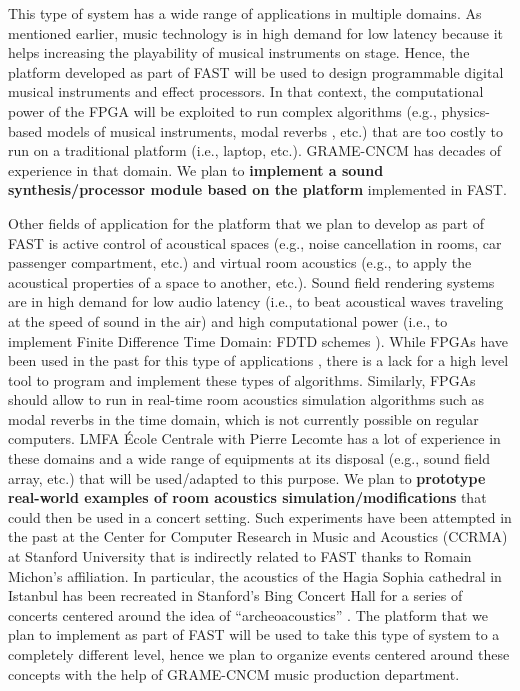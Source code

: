 \documentclass[a4paper,10pt]{article}
\newcommand{\PP}{FAST}
\begin{document}
This type of system has a wide range of applications in multiple domains. As mentioned earlier, music technology is in high demand for low latency because it helps increasing the playability of musical instruments on stage. Hence, the platform developed as part of \PP{} will be used to design programmable digital musical instruments and effect processors. In that context, the computational power of the FPGA will be exploited to run complex algorithms (e.g., physics-based models of musical instruments, modal reverbs \cite{Abel2009}, etc.) that are too costly to run on a traditional platform (i.e., laptop, etc.). GRAME-CNCM has decades of experience in that domain. We plan to \textbf{implement a sound synthesis/processor module based on the platform} implemented in \PP{}.

Other fields of application for the platform that we plan to develop as part of \PP{} is active control of acoustical spaces (e.g., noise cancellation in rooms, car passenger compartment, etc.) and virtual room acoustics (e.g., to apply the acoustical properties of a space to another, etc.). Sound field rendering systems are in high demand for low audio latency (i.e., to beat acoustical waves traveling at the speed of sound in the air) and high computational power (i.e., to implement Finite Difference Time Domain: FDTD schemes \cite{Bilbao2009}). While FPGAs have been used in the past for this type of applications \cite{Tan2019}, there is a lack for a high level tool to program and implement these types of algorithms. Similarly, FPGAs should allow to run in real-time room acoustics simulation algorithms such as modal reverbs \cite{Abel2019} in the time domain, which is not currently possible on regular computers. LMFA École Centrale with Pierre Lecomte has a lot of experience in these domains and a wide range of equipments at its disposal (e.g., sound field array, etc.) that will be used/adapted to this purpose. We plan to \textbf{prototype real-world examples of room acoustics simulation/modifications} that could then be used in a concert setting. Such experiments have been attempted in the past at the Center for Computer Research in Music and Acoustics (CCRMA) at Stanford University that is indirectly related to \PP{} thanks to Romain Michon's affiliation. In particular, the acoustics of the Hagia Sophia cathedral in Istanbul has been recreated in Stanford's Bing Concert Hall for a series of concerts centered around the idea of ``archeoacoustics'' \cite{Abel2009}. The platform that we plan to implement as part of \PP{} will be used to take this type of system to a completely different level, hence we plan to organize events centered around these concepts with the help of GRAME-CNCM music production department.
\end{document}
